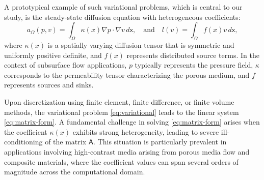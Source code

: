 \documentclass[preprint,12pt]{elsarticle}
\begin{document}
  A prototypical example of such variational problems, which is central to our
  study, is the steady-state diffusion equation with heterogeneous coefficients:
  \begin{equation}
    a_{\Omega}(p, v) = \int_{\Omega}\kappa(x) \nabla p \cdot \nabla v \, d\mathsf{x}
    , \quad \text{and}\quad l(v) = \int_{\Omega}f(x) v \, d\mathsf{x},
  \end{equation}
  where $\kappa(x)$ is a spatially varying diffusion tensor that is symmetric
  and uniformly positive definite, and $f(x)$ represents distributed source terms.
  In the context of subsurface flow applications, $p$ typically represents the pressure
  field, $\kappa$ corresponds to the permeability tensor characterizing the
  porous medium, and $f$ represents sources and sinks.

  Upon discretization using finite element, finite difference, or finite volume methods,
  the variational problem \eqref{eq:variational} leads to the linear system \eqref{eq:matrix-form}.
  A fundamental challenge in solving \eqref{eq:matrix-form} arises when the
  coefficient $\kappa(x)$ exhibits strong heterogeneity, leading to severe ill-conditioning
  of the matrix $\mathsf{A}$. This situation is particularly prevalent in
  applications involving high-contrast media arising from porous media flow and
  composite materials, where the coefficient values can span several orders of magnitude
  across the computational domain.
\end{document}
